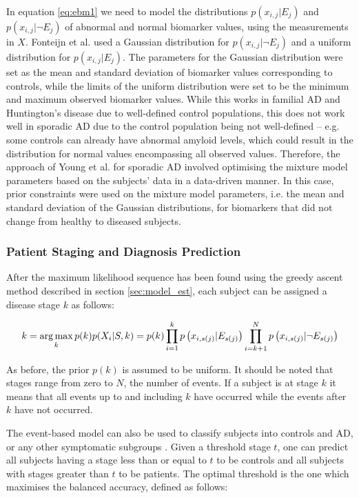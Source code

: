 In equation \ref{eq:ebm1} we need to model the distributions $p\left(x_{i,j} | E_{j} \right)$ and $p\left(x_{i,j} | \neg E_{j}\right)$ of abnormal and normal biomarker values, using the measurements in $X$. Fonteijn et al. \cite{fonteijn2012event} used a Gaussian distribution for $p\left(x_{i,j} | \neg E_{j}\right)$ and a uniform distribution for $p\left(x_{i,j} | E_{j} \right)$. The parameters for the Gaussian distribution were set as the mean and standard deviation of biomarker values corresponding to controls, while the limits of the uniform distribution were set to be the minimum and maximum observed biomarker values. While this works in familial AD and Huntington's disease \cite{fonteijn2012event} due to well-defined control populations, this does not work well in sporadic AD due to the control population being not well-defined -- e.g. some controls can already have abnormal amyloid levels, which could result in the distribution for normal values encompassing all observed values. Therefore, the approach of Young et al. \cite{young2014data} for sporadic AD involved optimising the mixture model parameters based on the subjects' data in a data-driven manner. In this case, prior constraints were used on the mixture model parameters, i.e. the mean and standard deviation of the Gaussian distributions, for biomarkers that did not change from healthy to diseased subjects.

\subsubsection{Patient Staging and Diagnosis Prediction}
\label{sec:staging}

After the maximum likelihood sequence has been found using the greedy ascent method described in section \ref{sec:model_est}, each subject can be assigned a disease stage $k$ as follows:

\begin{equation}
\label{eq:staging}
 k = \operatorname*{arg\,max}_k p(k) p(X_i | S, k) = p(k) \prod_{i=1}^k p\left(x_{i,s(j)} | E_{s(j)} \right) \prod_{i=k+1}^N p\left(x_{i,s(j)} | \neg E_{s(j)}\right)
\end{equation}
 
As before, the prior $p(k)$ is assumed to be uniform. It should be noted that stages range from zero to $N$, the number of events. If a subject is at stage $k$ it means that all events up to and including $k$ have occurred while the events after $k$ have not occurred. 

The event-based model can also be used to classify subjects into controls and AD, or any other symptomatic subgroups \cite{young2014data}. Given a threshold stage $t$, one can predict all subjects having a stage less than or equal to $t$ to be controls and all subjects with stages greater than $t$ to be patients. The optimal threshold is the one which maximises the balanced accuracy, defined as follows:

